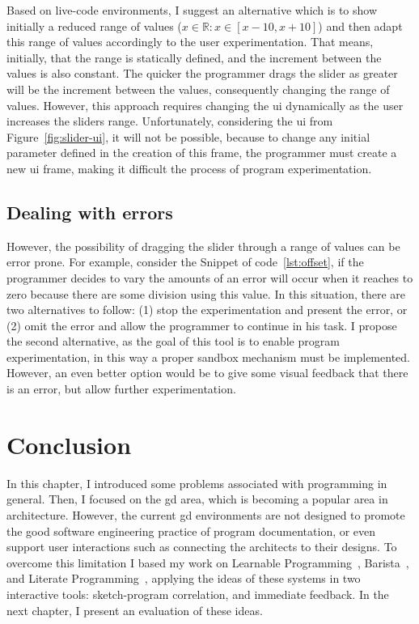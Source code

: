Based on live-code environments, I suggest an alternative which is to show initially a reduced range of values ($x \in \mathds{R} : x \in [x-10, x+10]$) and then adapt this range of values accordingly to the user experimentation. That means, initially, that the range is statically defined, and the increment between the values is also constant. The quicker the programmer drags the slider as greater will be the increment between the values, consequently changing the range of values. However, this approach requires changing the \gls{ui} dynamically as the user increases the sliders range. Unfortunately, considering the \gls{ui} from Figure~\ref{fig:slider-ui}, it will not be possible, because to change any initial parameter defined in the creation of this frame, the programmer must create a new \gls{ui} frame, making it difficult the process of program experimentation.

\subsection{Dealing with errors}

However, the possibility of dragging the slider through a range of values can be error prone. For example, consider the Snippet of code~\ref{lst:offset}, if the programmer decides to vary the amounts of  an error will occur when it reaches to zero because there are some division using this value. In this situation, there are two alternatives to follow: (1) stop the experimentation and present the error, or (2) omit the error and allow the programmer to continue in his task. I propose the second alternative, as the goal of this tool is to enable program experimentation, in this way a proper sandbox mechanism must be implemented. However, an even better option would be to give some visual feedback that there is an error, but allow further experimentation.

\section{Conclusion}

In this chapter, I introduced some problems associated with programming in general. Then, I focused on the \gls{gd} area, which is becoming a popular area in architecture. However, the current \gls{gd} environments are not designed to promote the good software engineering practice of program documentation, or even support user interactions such as connecting the architects to their designs. To overcome this limitation I based my work on Learnable Programming~\citep{learnableProg}, Barista~\citep{ko2006barista}, and Literate Programming~\citep{knuth1984literate}, applying the ideas of these systems in two interactive tools: sketch-program correlation, and immediate feedback. In the next chapter, I present an evaluation of these ideas.